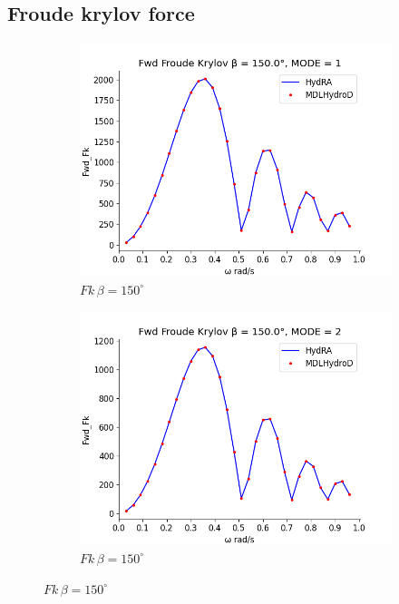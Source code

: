 \subsection{Froude krylov force}
\begin{figure}[H]
    \centering
    \begin{subfigure}[b]{0.49\textwidth}
        \includegraphics[width=\textwidth]{plots/kvlcc/fk/fk1.png}
        \caption{$Fk \, \beta = 150^{\circ}$}
    \end{subfigure}
    \begin{subfigure}[b]{0.49\textwidth}
        \includegraphics[width=\textwidth]{plots/kvlcc/fk/fk2.png}
        \caption{$Fk \, \beta = 150^{\circ}$}
    \end{subfigure}

\end{figure}
